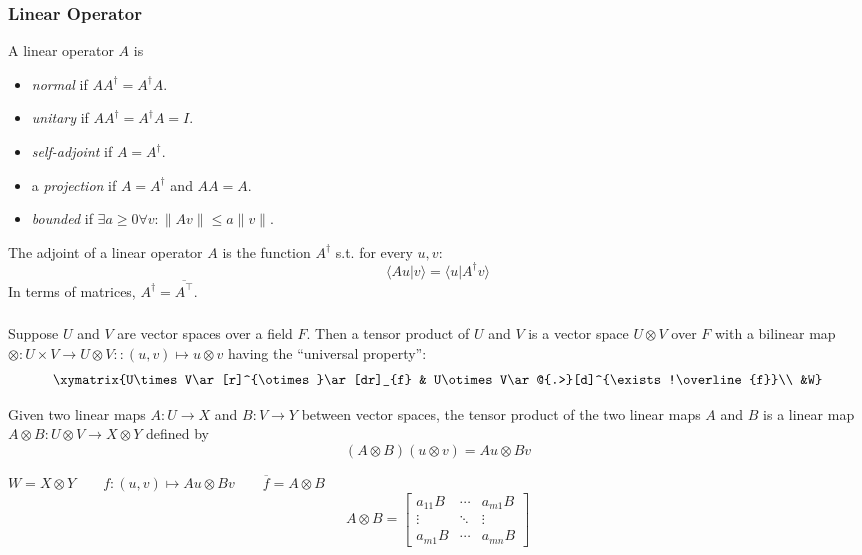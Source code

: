 \documentclass[UTF8,aspectratio=43,11pt,colorlinks,compress,openany]{beamer}%
\begin{document}
\begin{frame}\frametitle{Linear Operator}
\begin{definition}
	A linear operator $A$ is
\begin{itemize}
	\item \emph{normal} if $AA^\dagger=A^\dagger A$.
	\item \emph{unitary} if $AA^\dagger=A^\dagger A=I$.
	\item \emph{self-adjoint} if $A=A^\dagger$.
	\item a \emph{projection} if $A=A^\dagger$ and $AA=A$.
	\item \emph{bounded} if $\exists a\geq 0\forall v: \|Av\|\leq a\|v\|$.
\end{itemize}
\end{definition}
The adjoint of a linear operator $A$ is the function $A^\dagger$ s.t. for every $u,v$:
\[\langle Au|v\rangle=\langle u|A^\dagger v\rangle\]
In terms of matrices, $A^\dagger=\overline{A^\top}$.
\end{frame}

\begin{frame}\frametitle{}
\setlength\abovedisplayskip{0pt}
\setlength\belowdisplayskip{0pt}
\begin{definition}
Suppose $U$ and $V$ are vector spaces over a field $F$. Then a tensor product of $U$ and $V$ is a vector space $U\otimes V$ over $F$ with a bilinear map $\otimes: U\times V\to U\otimes V :: (u,v)\mapsto u\otimes v$ having the ``universal property'':
\[\xymatrix{U\times V\ar[r]^{\otimes}\ar[dr]_{f} & U\otimes V\ar@{.>}[d]^{\exists!\overline{f}}\\ &W}\]
\end{definition}
\begin{block}{}
	Given two linear maps $A: U \to X$ and $B: V \to Y$ between vector spaces, the tensor product of the two linear maps $A$ and $B$ is a linear map $A\otimes B: U\otimes V\to X\otimes Y$ defined by
\[(A\otimes B)(u\otimes v)=Au\otimes Bv\]
\end{block}
$W=X\otimes Y\qquad f:(u,v)\mapsto Au\otimes Bv\qquad \overline{f}=A\otimes B$
\[
A\otimes B=
\begin{bmatrix}
	a_{11}B &\cdots &a_{m1}B\\
	\vdots &\ddots &\vdots\\
	a_{m1}B &\cdots &a_{mn}B
\end{bmatrix}
\]
\end{frame}
\end{document}
